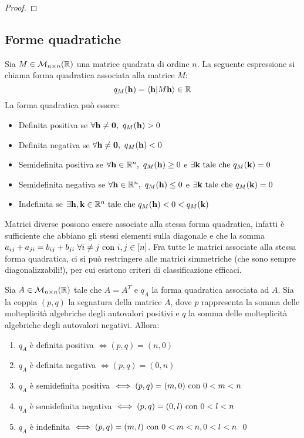 \begin{proof}
\end{proof}

\subsection{Forme quadratiche}

Sia $M \in \mathcal{M}_{n \times n}(\mathbb{R})$ una matrice quadrata di ordine $n$. La seguente espressione si chiama forma quadratica associata alla matrice $M$:
\begin{equation*}
    q_M(\vb{h}) = \innerproduct{\vb{h}}{M\vb{h}} \in \R
\end{equation*}
La forma quadratica può essere:
\begin{itemize}
    \item Definita positiva se $\forall \vb{h}\neq \vb{0}, \ q_M(\vb{h})> 0$
    \item Definita negativa se $\forall \vb{h}\neq \vb{0}, \ q_M(\vb{h}) < 0$
    \item Semidefinita positiva se $\forall \vb{h}\in \mathbb{R}^n, \ q_M(\vb{h}) \geq 0$ e $\exists \vb{k} \text{ tale che } q_M(\vb{k})=0$
    \item Semidefinita negativa se $\forall \vb{h}\in \mathbb{R}^n, \ q_M(\vb{h}) \leq 0$ e $\exists \vb{k} \text{ tale che } q_M(\vb{k})=0$
    \item Indefinita se $\exists \vb{h}, \vb{k} \in \mathbb{R}^n \text{ tale che } q_M(\vb{h}) < 0 < q_M(\vb{k})$
\end{itemize}

Matrici diverse possono essere associate alla stessa forma quadratica, infatti è sufficiente che abbiano gli stessi elementi sulla diagonale e che la somma $a_{ij}+a_{ji}=b_{ij}+b_{ji} \ \forall i\neq j\text{ con } i,j \in [n]$. Fra tutte le matrici associate alla stessa forma quadratica, ci si può restringere alle matrici simmetriche (che sono sempre diagonalizzabili!), per cui esistono criteri di classificazione efficaci.

\begin{theorem}
    Sia $A \in \mathcal{M}_{n\times n}(\mathbb{R})$ tale che $A=A^T$ e $q_A$ la forma quadratica associata ad $A$. Sia la coppia $(p,q)$ la segnatura della matrice $A$, dove $p$ rappresenta la somma delle molteplicità algebriche degli autovalori positivi e $q$ la somma delle molteplicità algebriche degli autovalori negativi. Allora:
    \begin{enumerate}
        \item $q_A$ è definita positiva $\iff (p,q)=(n,0)$
        \item $q_A$ è definita negativa $\iff (p,q)=(0,n)$
        \item $q_A$ è semidefinita positiva $\iff (p,q)=(m,0) \text{ con } 0< m < n$
        \item $q_A$ è semidefinita negativa $\iff (p,q)=(0,l) \text{ con } 0< l < n$
        \item $q_A$ è indefinita $\iff (p,q)=(m,l) \text{ con } 0<m<n,0<l<n$
        \qed
    \end{enumerate}
\end{theorem}

